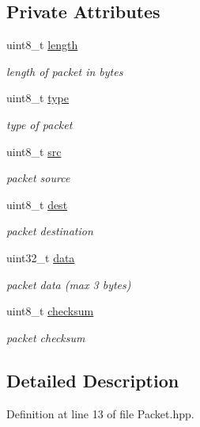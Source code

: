 \subsection*{Private Attributes}
\begin{DoxyCompactItemize}
\item 
uint8\+\_\+t \hyperlink{class_packet_adf5f5bae43f927d2977833232f4b9562}{length}
\begin{DoxyCompactList}\small\item\em length of packet in bytes \end{DoxyCompactList}\item 
uint8\+\_\+t \hyperlink{class_packet_a496cc4e5c913eefa002539663d147cfb}{type}
\begin{DoxyCompactList}\small\item\em type of packet \end{DoxyCompactList}\item 
uint8\+\_\+t \hyperlink{class_packet_a7dc8f5be9690e925a11839c3e7869eef}{src}
\begin{DoxyCompactList}\small\item\em packet source \end{DoxyCompactList}\item 
uint8\+\_\+t \hyperlink{class_packet_a0a6e83b74c425ade443382233ccfc865}{dest}
\begin{DoxyCompactList}\small\item\em packet destination \end{DoxyCompactList}\item 
uint32\+\_\+t \hyperlink{class_packet_a3db8a3abfccbe7a2c2b8f63b4b9fb31e}{data}
\begin{DoxyCompactList}\small\item\em packet data (max 3 bytes) \end{DoxyCompactList}\item 
uint8\+\_\+t \hyperlink{class_packet_a900989fb6f663e8c66faeadb3dc7a318}{checksum}
\begin{DoxyCompactList}\small\item\em packet checksum \end{DoxyCompactList}\end{DoxyCompactItemize}


\subsection{Detailed Description}


Definition at line 13 of file Packet.\+hpp.



